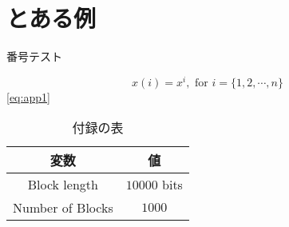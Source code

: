 \chapter{とある例}\label{app:example}

番号テスト

\begin{equation}
x(i)=x^i, \textrm{ for } i=\{1,2,\cdots,n\} \label{eq:app1}
\end{equation}
\eqref{eq:app1}


\begin{table}[ht]
\centering
\begin{tabular}{c|c}
\hline
\bfseries 変数 & \bfseries 値 \\
\hline
\hline
Block length & $10000$ bits \\
\hline
Number of Blocks & $1000$ \\
\hline
\end{tabular}
\caption{付録の表}\label{table:app}
\end{table}
